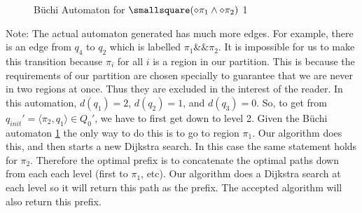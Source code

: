 \begin{figure}
\centering
{}
\caption{B\"uchi Automaton for $\smallsquare(\diamond \pi_1 \land \diamond \pi_2 )$ 1}
\label{fig:gasBuchiRec}
\end{figure}
Note: The actual automaton generated has much more edges. For example, there is an edge from $q_4$ to $q_2$ which is labelled $\pi_1 \&\& \pi_2$. It is impossible for us to make this transition because $\pi_i$ for all $i$ is a region in our partition. This is because the requirements of our partition are chosen specially to guarantee that we are never in two regions at once. Thus they are excluded in the interest of the reader. In this automation, $d(q_1)=2$, $d(q_2)=1$, and $d(q_3)=0$. So, to get from $q_{init}' = \langle \pi_2, q_1 \rangle \in Q_0'$, we have to first get down to level 2. Given the B\"{u}chi automaton \ref{fig:gasBuchiRec} the only way to do this is to go to region $\pi_1$. Our algorithm does this, and then starts a new Dijkstra search. In this case the same statement holds for $\pi_2$. Therefore the optimal prefix is to concatenate the optimal paths down from each each level (first to $\pi_1$, etc). Our algorithm does a Dijkstra search at each level so it will return this path as the prefix. The accepted algorithm will also return this prefix. 

